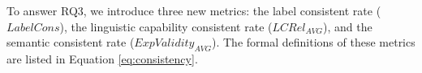  



To answer RQ3, we introduce three new metrics: the label consistent rate ($LabelCons$), the linguistic capability consistent rate ($LCRel_{AVG}$), and the semantic consistent rate ($ExpValidity_{AVG}$). The formal definitions of these metrics are listed in Equation \ref{eq:consistency}.
 
